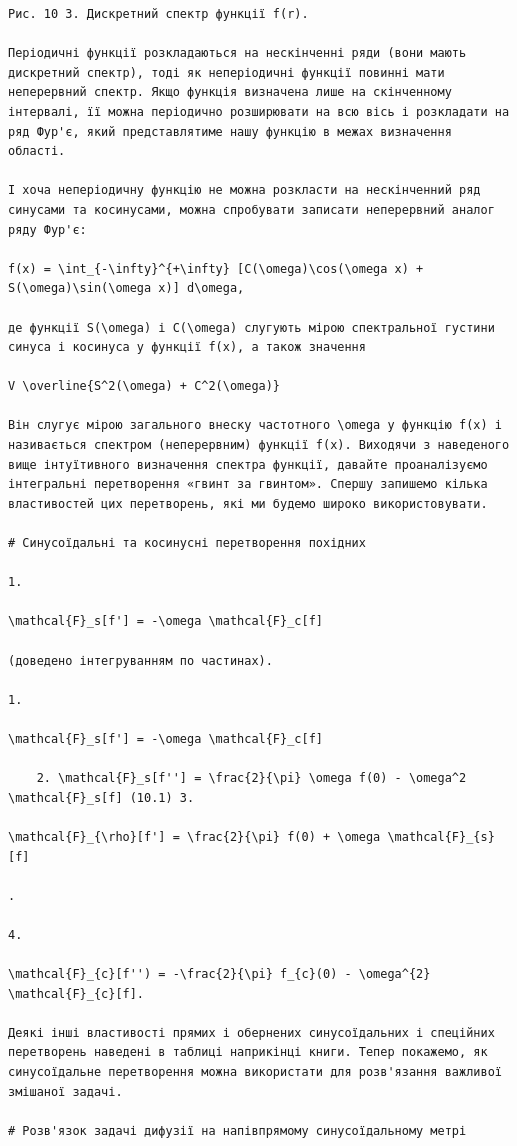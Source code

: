 \documentclass[
  ukrainian,
]{article}
\begin{document}
\begin{verbatim}
Рис. 10 3. Дискретний спектр функції f(r).

Періодичні функції розкладаються на нескінченні ряди (вони мають дискретний спектр), тоді як неперіодичні функції повинні мати неперервний спектр. Якщо функція визначена лише на скінченному інтервалі, її можна періодично розширювати на всю вісь і розкладати на ряд Фур'є, який представлятиме нашу функцію в межах визначення області.

І хоча неперіодичну функцію не можна розкласти на нескінченний ряд синусами та косинусами, можна спробувати записати неперервний аналог ряду Фур'є:

f(x) = \int_{-\infty}^{+\infty} [C(\omega)\cos(\omega x) + S(\omega)\sin(\omega x)] d\omega,

де функції S(\omega) і C(\omega) слугують мірою спектральної густини синуса і косинуса у функції f(x), а також значення

V \overline{S^2(\omega) + C^2(\omega)}

Він слугує мірою загального внеску частотного \omega у функцію f(x) і називається спектром (неперервним) функції f(x). Виходячи з наведеного вище інтуїтивного визначення спектра функції, давайте проаналізуємо інтегральні перетворення «гвинт за гвинтом». Спершу запишемо кілька властивостей цих перетворень, які ми будемо широко використовувати.

# Синусоїдальні та косинусні перетворення похідних

1.

\mathcal{F}_s[f'] = -\omega \mathcal{F}_c[f]

(доведено інтегруванням по частинах).

1.

\mathcal{F}_s[f'] = -\omega \mathcal{F}_c[f]

    2. \mathcal{F}_s[f''] = \frac{2}{\pi} \omega f(0) - \omega^2 \mathcal{F}_s[f] (10.1) 3.

\mathcal{F}_{\rho}[f'] = \frac{2}{\pi} f(0) + \omega \mathcal{F}_{s}[f]

.

4.

\mathcal{F}_{c}[f'') = -\frac{2}{\pi} f_{c}(0) - \omega^{2} \mathcal{F}_{c}[f].

Деякі інші властивості прямих і обернених синусоїдальних і спеційних перетворень наведені в таблиці наприкінці книги. Тепер покажемо, як синусоїдальне перетворення можна використати для розв'язання важливої змішаної задачі.

# Розв'язок задачі дифузії на напівпрямому синусоїдальному метрі


\end{verbatim}
\end{document}
